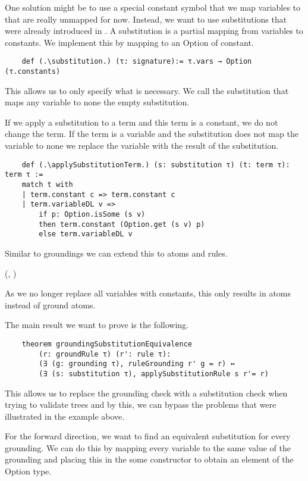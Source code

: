     One solution might be to use a special constant symbol that we map variables to that are really unmapped for now.
    Instead, we want to use substitutions that were already introduced in \cite{datalogCoq}. A substitution is a partial mapping from variables to constants. We implement this by mapping to an Option of constant.

    \begin{lstlisting}
    def (.\substitution.) (τ: signature):= τ.vars → Option (τ.constants)
    \end{lstlisting}

    This allows us to only specify what is necessary. We call the substitution that maps any variable to none the empty substitution.
    
    If we apply a substitution to a term and this term is a constant, we do not change the term. If the term is a variable and the substitution does not map the variable to none we replace the variable with the result of the substitution.

    \begin{lstlisting}
    def (.\applySubstitutionTerm.) (s: substitution τ) (t: term τ): term τ :=
    match t with
    | term.constant c => term.constant c
    | term.variableDL v => 
        if p: Option.isSome (s v) 
        then term.constant (Option.get (s v) p) 
        else term.variableDL v
    \end{lstlisting}

    Similar to groundings we can extend this to atoms and rules. 
    
    (\applySubstitutionAtom, \applySubstitutionRule)
    
    As we no longer replace all variables with constants, this only results in atoms instead of ground atoms.

    The main result we want to prove is the following.

    \begin{lstlisting}
    theorem groundingSubstitutionEquivalence 
        (r: groundRule τ) (r': rule τ):
        (∃ (g: grounding τ), ruleGrounding r' g = r) ↔ 
        (∃ (s: substitution τ), applySubstitutionRule s r'= r)
    \end{lstlisting}

    This allows us to replace the grounding check with a substitution check when trying to validate trees and by this, we can bypass the problems that were illustrated in the example above. 

    For the forward direction, we want to find an equivalent substitution for every grounding. We can do this by mapping every variable to the same value of the grounding and placing this in the some constructor to obtain an element of the Option type.


